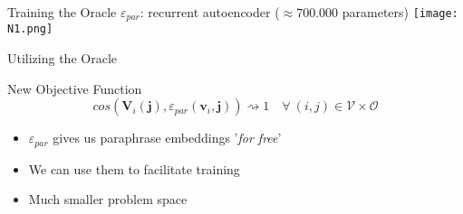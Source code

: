 \documentclass{beamer}
\begin{document}
\begin{frame}{Training the Oracle}
$\varepsilon_{par}$: \alert{recurrent autoencoder} ($\approx 700.000$ parameters)
\texttt{[image: N1.png]}
\end{frame}

\begin{frame}{Utilizing the Oracle}
\begin{block}{New Objective Function}
\[
cos(\pmb{V}_i(\pmb{j}), \varepsilon_{par}(\pmb{v}_i,\pmb{j})) \rightsquigarrow 1
\quad \forall \ (i,j) \in \mathcal{V} \times \mathcal{O}
\]
\end{block}

\begin{itemize}
\item $\varepsilon_{par}$ gives us paraphrase embeddings '\textit{for free}'
\item We can use them to facilitate training
\item Much smaller problem space
\end{itemize}
\end{frame}
\end{document}
